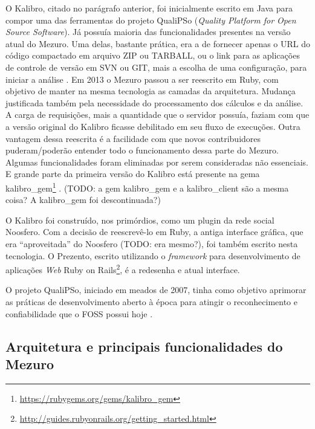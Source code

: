 O Kalibro, citado no parágrafo anterior, foi inicialmente escrito em Java para
compor uma das ferramentas do projeto QualiPSo (\textit{Quality Platform for
Open Source Software}). Já possuía maioria das funcionalidades presentes na
versão atual do Mezuro. Uma delas, bastante prática, era a de fornecer apenas o
URL do código compactado em arquivo ZIP ou TARBALL, ou o link para as
aplicações de controle de versão em SVN ou GIT, mais a escolha de uma
configuração, para iniciar a análise \cite{camarinhaOSS2015}. Em 2013 o Mezuro
passou a ser reescrito em Ruby, com objetivo de manter na mesma tecnologia as
camadas da arquitetura. Mudança justificada também pela necessidade do
processamento dos cálculos e da análise. A carga de requisições, mais a
quantidade que o servidor possuía, faziam com que a versão original do Kalibro
ficasse debilitado em seu fluxo de execuções. Outra vantagem dessa reescrita é
a facilidade com que novos contribuidores puderam/poderão entender todo o
funcionamento dessa parte do Mezuro. Algumas funcionalidades foram eliminadas
por serem consideradas não essenciais. E grande parte da primeira versão do
Kalibro está presente na gema kalibro\_gem\footnote{\url{https://rubygems.org/gems/kalibro_gem}}
\cite{meirellesCibse2015}.
(TODO: a gem kalibro\_gem e a kalibro\_client são a mesma coisa? A kalibro\_gem
foi descontinuada?)


O Kalibro foi construído, nos primórdios, como um plugin da rede social
Noosfero. Com a decisão de reescrevê-lo em Ruby, a antiga interface gráfica,
que era ``aproveitada'' do Noosfero (TODO: era mesmo?), foi também escrito nesta
tecnologia. O Prezento, escrito utilizando o \textit{framework} para
desenvolvimento de aplicações \textit{Web} Ruby on Rails\footnote{\url{http://guides.rubyonrails.org/getting_started.html}},
é a redesenha e atual interface.



O projeto QualiPSo, iniciado em meados de 2007, tinha como objetivo aprimorar
as práticas de desenvolvimento aberto à época para atingir o reconhecimento e
confiabilidade que o FOSS possui hoje \cite{messias2012}.

\subsection{Arquitetura e principais funcionalidades do Mezuro}

